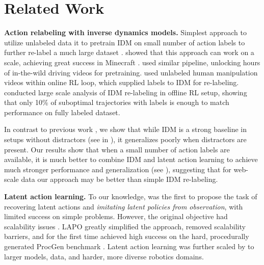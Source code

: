\section{Related Work}
\textbf{Action relabeling with inverse dynamics models.} Simplest approach to utilize unlabeled data it to pretrain IDM on small number of action labels to further re-label a much large dataset \citep{torabi2018behavioral}. \citet{baker2022video} showed that this approach can work on a scale, achieving great success in Minecraft \citep{pmlr-v176-kanervisto22a}. \citet{zhang2022learning} used similar pipeline, unlocking hours of in-the-wild driving videos for pretraining. \citet{schmeckpeper2020reinforcement} used unlabeled human manipulation videos within online RL loop, which supplied labels to IDM for re-labeling. \citet{zheng2023semi} conducted large scale analysis of IDM re-labeling in offline RL setup, showing that only 10\% of suboptimal trajectories with labels is enough to match performance on fully labeled dataset.

In contrast to previous work \citep{schmeckpeper2020reinforcement, baker2022video, zheng2023semi}, we show that while IDM is a strong baseline in setups without distractors (see  in ), it generalizes poorly when distractors are present. Our results show that when a small number of action labels are available, it is much better to combine IDM and latent action learning to achieve much stronger performance and generalization (see ), suggesting that for web-scale data \citep{baker2022video, zhang2022learning} our approach may be better than simple IDM re-labeling. 

\textbf{Latent action learning.} To our knowledge, \citet{edwards2019imitating} was the first to propose the task of recovering latent actions and \emph{imitating latent policies from observation}, with limited success on simple problems. However, the original objective had scalability issues \citep{struckmeier2023preventing}. LAPO \citep{schmidt2023learning} greatly simplified the approach, removed scalability barriers, and for the first time achieved high success on the hard, procedurally generated ProcGen benchmark \citep{cobbe2020leveraging}. Latent action learning was further scaled by \citet{bruce2024genie, cui2024dynamo, ye2024latent, chen2024moto} to larger models, data, and harder, more diverse robotics domains. 

